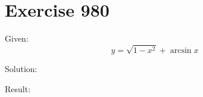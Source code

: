 \documentclass[a4paper, 10pt]{scrartcl}
\begin{document}
\section{Exercise 980}

Given:
\[
y = \sqrt{1 - x^{2}} + \arcsin{x}
\]

Solution:

Result:
\end{document}

